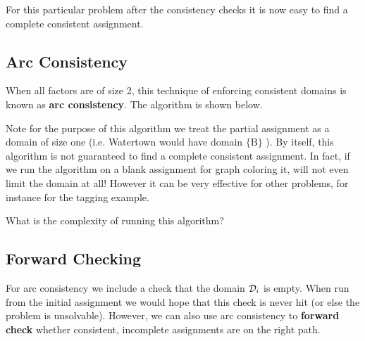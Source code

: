 \documentclass[11pt]{article}
\begin{document}
\noindent For this particular problem after the consistency checks it is now easy to find a complete consistent assignment. 

\subsection{Arc Consistency}

When all factors are of size 2, this technique of enforcing consistent
domains is known as \textbf{arc consistency}. The algorithm is shown
below.

\begin{algorithm}[h]

\begin{algorithmic}[1]

  \EndIf{}
  \EndFor{}
  \EndIf{}
  \EndFor{}
  \EndIf{}
  \EndWhile{}
  \EndProcedure{}
\end{algorithmic}
\end{algorithm}

Note for the purpose of this algorithm we treat the partial assignment as a domain of size one (i.e. Watertown would have domain $\{\mathrm{B}\}$ ). By itself, this algorithm is not guaranteed to find a complete consistent assignment. In fact, if we run the algorithm on a blank assignment for graph coloring it, will not even limit the domain at all! However it can be very effective for other problems, for instance for the tagging example. 

\begin{exercise}
  What is the complexity of running this algorithm?
\end{exercise}

\censor{}

\subsection{Forward Checking}

For arc consistency we include a check that the domain $\mathcal{D}_i$ is
empty. When run from the initial assignment we would hope that this
check is never hit (or else the problem is unsolvable). However, we
can also use arc consistency to \textbf{forward check} whether consistent, 
incomplete assignments are on the right path. 
\end{document}
